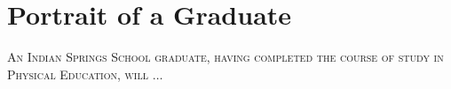 \section{Portrait of a Graduate}

\textsc{An Indian Springs School graduate, having completed the course of study in Physical Education, will} $\ldots$ 